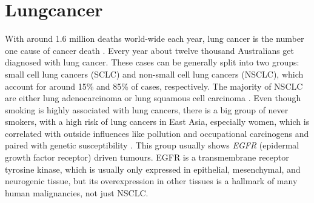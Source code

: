 \section{Lungcancer}
\label{intro-sec:lungcancer}

With around 1.6 million deaths world-wide each year, lung cancer is the number one cause of cancer death \cite{Siegel2018}. Every year about twelve thousand Australians get diagnosed with lung cancer. These cases can be generally split into two groups: small cell lung cancers (SCLC) and non-small cell lung cancers (NSCLC), which account for around 15\% and 85\% of cases, respectively. The majority of NSCLC are either lung adenocarcinoma or lung squamous cell carcinoma \cite{Molina2008}. Even though smoking is highly associated with lung cancers, there is a big group of never smokers, with a high risk of lung cancers in East Asia, especially women, which is correlated with outside influences like pollution and occupational carcinogens and paired with genetic susceptibility \cite{Sun2007}.
This group usually shows \textit{EGFR} (epidermal growth factor receptor) driven tumours. EGFR is a transmembrane receptor tyrosine kinase, which is usually only expressed in epithelial, mesenchymal, and neurogenic tissue, but its overexpression in other tissues is a hallmark of many human malignancies, not just NSCLC.



